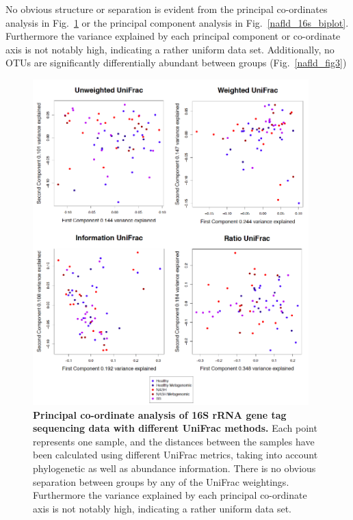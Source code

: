No obvious structure or separation is evident from the principal co-ordinates analysis in Fig.~\ref{nafld_pcoa} or the principal component analysis in Fig.~\ref{nafld_16s_biplot}. Furthermore the variance explained by each principal component or co-ordinate axis is not notably high, indicating a rather uniform data set. Additionally, no OTUs are significantly differentially abundant between groups (Fig.~\ref{nafld_fig3})

\begin{figure}[h]
\begin{center}
\includegraphics[width=0.95\textwidth]{nafld_16s_pcoa.png}
\caption[Principal co-ordinate analysis of 16S rRNA gene tag sequencing data with different UniFrac weightings.]{\textbf{Principal co-ordinate analysis of 16S rRNA gene tag sequencing data with different UniFrac methods.} Each point represents one sample, and the distances between the samples have been calculated using different UniFrac metrics, taking into account phylogenetic as well as abundance information. There is no obvious separation between groups by any of the UniFrac weightings. Furthermore the variance explained by each principal co-ordinate axis is not notably high, indicating a rather uniform data set.}
\label{nafld_pcoa}
\end{center}
\end{figure}

